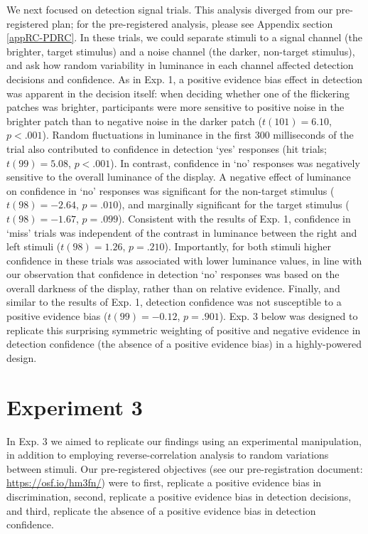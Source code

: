 \documentclass[12pt,twoside]{reedthesis}
\begin{document}
We next focused on detection signal trials. This analysis diverged from our pre-registered plan; for the pre-registered analysis, please see Appendix section \ref{appRC-PDRC}. In these trials, we could separate stimuli to a signal channel (the brighter, target stimulus) and a noise channel (the darker, non-target stimulus), and ask how random variability in luminance in each channel affected detection decisions and confidence. As in Exp. 1, a positive evidence bias effect in detection was apparent in the decision itself: when deciding whether one of the flickering patches was brighter, participants were more sensitive to positive noise in the brighter patch than to negative noise in the darker patch (\(t(101) = 6.10\), \(p < .001\)). Random fluctuations in luminance in the first 300 milliseconds of the trial also contributed to confidence in detection `yes' responses (hit trials; \(t(99) = 5.08\), \(p < .001\)). In contrast, confidence in `no' responses was negatively sensitive to the overall luminance of the display. A negative effect of luminance on confidence in `no' responses was significant for the non-target stimulus (\(t(98) = -2.64\), \(p = .010\)), and marginally significant for the target stimulus (\(t(98) = -1.67\), \(p = .099\)). Consistent with the results of Exp. 1, confidence in `miss' trials was independent of the contrast in luminance between the right and left stimuli (\(t(98) = 1.26\), \(p = .210\)). Importantly, for both stimuli higher confidence in these trials was associated with lower luminance values, in line with our observation that confidence in detection `no' responses was based on the overall darkness of the display, rather than on relative evidence. Finally, and similar to the results of Exp. 1, detection confidence was not susceptible to a positive evidence bias (\(t(99) = -0.12\), \(p = .901\)). Exp. 3 below was designed to replicate this surprising symmetric weighting of positive and negative evidence in detection confidence (the absence of a positive evidence bias) in a highly-powered design.

\hypertarget{experiment-3}{%
\section{Experiment 3}\label{experiment-3}}

In Exp. 3 we aimed to replicate our findings using an experimental manipulation, in addition to employing reverse-correlation analysis to random variations between stimuli. Our pre-registered objectives (see our pre-registration document: \url{https://osf.io/hm3fn/}) were to first, replicate a positive evidence bias in discrimination, second, replicate a positive evidence bias in detection decisions, and third, replicate the absence of a positive evidence bias in detection confidence.
\end{document}
